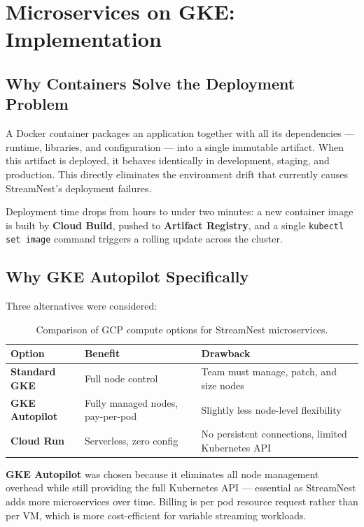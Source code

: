 \documentclass[12pt, a4paper]{article}
\begin{document}
\section{Microservices on GKE: Implementation}

\subsection{Why Containers Solve the Deployment Problem}

A Docker container packages an application together with all its dependencies — runtime, libraries, and configuration — into a single immutable artifact. When this artifact is deployed, it behaves identically in development, staging, and production. This directly eliminates the environment drift that currently causes StreamNest's deployment failures.

Deployment time drops from hours to under two minutes: a new container image is built by \textbf{Cloud Build}, pushed to \textbf{Artifact Registry}, and a single \texttt{kubectl set image} command triggers a rolling update across the cluster.

\subsection{Why GKE Autopilot Specifically}

Three alternatives were considered:

\begin{table}[htbp]
\centering
\renewcommand{\arraystretch}{1.4}
\begin{tabularx}{\linewidth}{>{\bfseries}l X X}
\toprule
Option & Benefit & Drawback \\
\midrule
Standard GKE & Full node control & Team must manage, patch, and size nodes \\
GKE Autopilot & Fully managed nodes, pay-per-pod & Slightly less node-level flexibility \\
Cloud Run & Serverless, zero config & No persistent connections, limited Kubernetes API \\
\bottomrule
\end{tabularx}
\caption{Comparison of GCP compute options for StreamNest microservices.}
\end{table}

\textbf{GKE Autopilot} was chosen because it eliminates all node management overhead while still providing the full Kubernetes API — essential as StreamNest adds more microservices over time. Billing is per pod resource request rather than per VM, which is more cost-efficient for variable streaming workloads.
\end{document}
